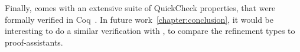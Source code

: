 Finally, \lbxmonad comes with an extensive suite of QuickCheck properties,
that were formally verified in Coq~\cite{Swierstra2012}. In future work~\ref{chapter:conclusion},
it would be interesting to do a similar verification with \toolname, 
to compare the refinement types to proof-assistants.

